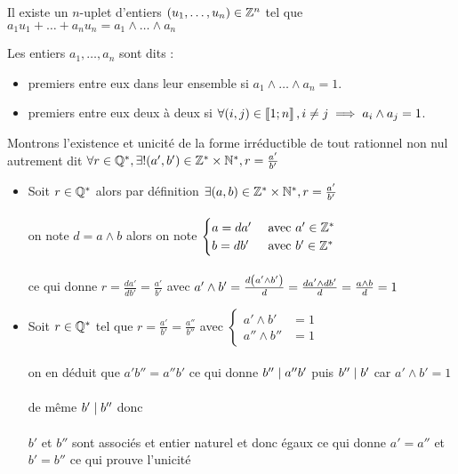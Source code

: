 \begin{defprop}
	Il existe un \(n\)-uplet d’entiers \((u_1, \dots , u_n) \in \mathbb{Z}^n\) tel que  \(a_1u_1 +\dots + a_nu_n = a_1 \wedge \dots \wedge a_n\)
\end{defprop}

\begin{defprop}
	Les entiers \(a_1, \dots , a_n\) sont dits :
	\begin{itemize}
		\item premiers entre eux dans leur ensemble si \(a_1 \wedge \dots \wedge a_n = 1\).
		\item premiers entre eux deux à deux si \(\forall (i, j) \in \left\llbracket1;n\right\rrbracket , i \neq j \implies a_i \wedge a_j = 1\).
	\end{itemize}
\end{defprop}
\begin{dem}
	Montrons l'existence et unicité de la forme irréductible de tout rationnel non nul autrement dit \(\forall r \in \mathbb{Q}^*, \exists ! (a',b') \in \mathbb{Z}^* \times \mathbb{N}^*, r = \frac{a'}{b'}\)
	\begin{itemize}
		\item \existence Soit \(r \in \mathbb{Q}^* \) alors par définition \(\exists (a,b) \in \mathbb{Z}^* \times \mathbb{N}^*, r = \frac{a'}{b'}\)\\~\\
		      on note \(d = a\wedge b\) alors on note \(\begin{cases}
			      a = da' & \text{ avec } a'\in \mathbb{Z}^*  \\
			      b = db' & \text{ avec } b' \in \mathbb{Z}^*
		      \end{cases}\)\\~\\
		      ce qui donne \(r = \frac{da'}{db'} = \frac{a'}{b'}\) avec \(a'\wedge b' = \frac{d\left(a'\wedge b'\right)}{d} = \frac{da' \wedge db'}{d} = \frac{a \wedge b}{d} = 1\)
		\item \unicite Soit \(r \in \mathbb{Q}^*\) tel que \(r = \frac{a'}{b'} = \frac{a''}{b''}\) avec \(\begin{cases}
			      a'\wedge b'    & = 1 \\
			      a'' \wedge b'' & = 1
		      \end{cases}\)\\~\\
		      on en déduit que \(a'b'' = a'' b'\) ce qui donne \(b''\mid a''b'\) puis \(b'' \mid b'\) car \(a'\wedge b' =1\) \\~\\
		      de même \(b'\mid b''\) donc \\~\\
		      \(b'\) et \(b''\) sont associés et entier naturel et donc égaux ce qui donne \(a' = a''\) et \(b' = b''\) ce qui prouve l'unicité
	\end{itemize}
\end{dem}
